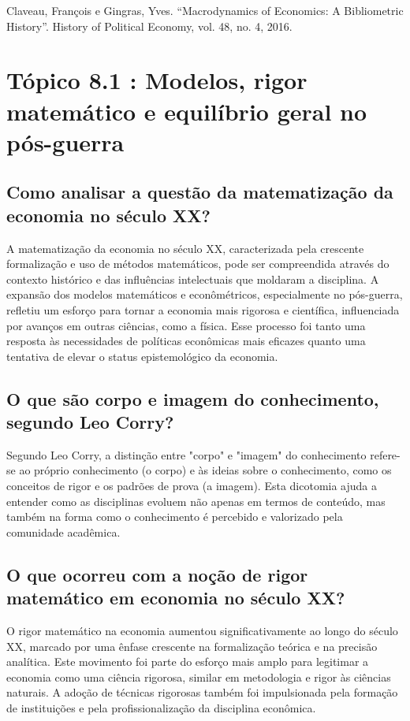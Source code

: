 \documentclass[a4paper,12pt]{article}[abntex2]
\begin{document}
Claveau, François e Gingras, Yves. “Macrodynamics of Economics: A Bibliometric History”.
History of Political Economy, vol. 48, no. 4, 2016.

\section{\textbf{Tópico 8.1 : Modelos, rigor matemático e equilíbrio geral no pós-guerra}}

\subsection{\textbf{Como analisar a questão da matematização da economia no século XX?}}
A matematização da economia no século XX, caracterizada pela crescente formalização e uso de métodos matemáticos, pode ser compreendida através do contexto histórico e das influências intelectuais que moldaram a disciplina. A expansão dos modelos matemáticos e econômétricos, especialmente no pós-guerra, refletiu um esforço para tornar a economia mais rigorosa e científica, influenciada por avanços em outras ciências, como a física. Esse processo foi tanto uma resposta às necessidades de políticas econômicas mais eficazes quanto uma tentativa de elevar o status epistemológico da economia.

\subsection{\textbf{O que são corpo e imagem do conhecimento, segundo Leo Corry?}}
Segundo Leo Corry, a distinção entre "corpo" e "imagem" do conhecimento refere-se ao próprio conhecimento (o corpo) e às ideias sobre o conhecimento, como os conceitos de rigor e os padrões de prova (a imagem). Esta dicotomia ajuda a entender como as disciplinas evoluem não apenas em termos de conteúdo, mas também na forma como o conhecimento é percebido e valorizado pela comunidade acadêmica.

\subsection{\textbf{O que ocorreu com a noção de rigor matemático em economia no século XX?}}
O rigor matemático na economia aumentou significativamente ao longo do século XX, marcado por uma ênfase crescente na formalização teórica e na precisão analítica. Este movimento foi parte do esforço mais amplo para legitimar a economia como uma ciência rigorosa, similar em metodologia e rigor às ciências naturais. A adoção de técnicas rigorosas também foi impulsionada pela formação de instituições e pela profissionalização da disciplina econômica.
\end{document}

